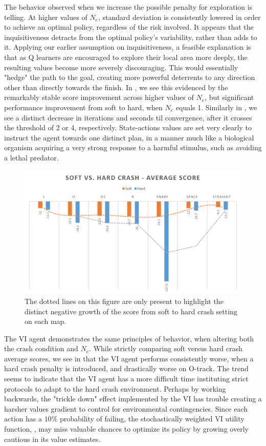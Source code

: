\documentclass[12pt, letter]{article}
\begin{document}
The behavior observed when we increase the possible penalty for exploration is telling.  At higher values of $N_e$, standard deviation is consistently lowered in order to achieve an optimal policy, regardless of the risk involved.  It appears that the inquisitiveness detracts from the optimal policy's variability, rather than adds to it.  Applying our earlier assumption on inquisitiveness, a feasible explanation is that as Q learners are encouraged to explore their local area more deeply, the resulting values become more severely discouraging.  This would essentially "hedge" the path to the goal, creating more powerful deterrents to any direction other than directly towards the finish.  In , we see this evidenced by the remarkably stable score improvement across higher values of $N_e$, but significant performance improvement from soft to hard, when $N_e$ equals 1.  Similarly in , we see a distinct decrease in iterations and seconds til convergence, after it crosses the threshold of 2 or 4, respectively.  State-actions values are set very clearly to instruct the agent towards one distinct plan, in a manner much like a biological organism acquiring a very strong response to a harmful stimulus, such as avoiding a lethal predator.

\begin{figure} 
    \centering
    \includegraphics[width=.6\textwidth]{img/softVhard/VI/AvgScoreWLines}
    \caption{The dotted lines on this figure are only present to highlight the distinct negative growth of the score from soft to hard crash setting on each map.}
    \label{fig:svhVIAvgScoreWLines}
\end{figure}

The VI agent demonstrates the same principles of behavior, when altering both the crash condition and $N_e$.  While strictly comparing soft versus hard crash average scores, we see in  that the VI agent performs consistently worse, when a hard crash penalty is introduced, and drastically worse on O-track.  The trend seems to indicate that the VI agent has a more difficult time instituting strict protocols to adapt to the hard crash environment.  Perhaps by working backwards, the "trickle down" effect implemented by the VI has trouble creating a harsher values gradient to control for environmental contingencies.  Since each action has a $10\%$ probability of failing, the stochastically weighted VI utility function, , may miss valuable chances to optimize its policy by growing overly cautious in its value estimates.
\end{document}
